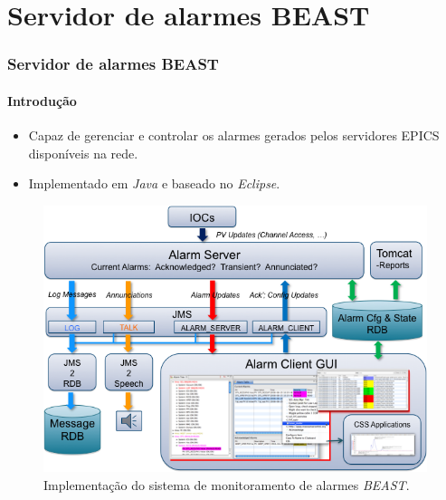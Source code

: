 
\section {Servidor de alarmes BEAST}

\begin{frame}
\frametitle{Servidor de alarmes BEAST}
\framesubtitle{Introdução}
\begin{itemize}
  \item Capaz de gerenciar e controlar os alarmes gerados pelos servidores
  EPICS disponíveis na rede.
  \item Implementado em \textit{Java} e baseado no \textit{Eclipse}.
\end{itemize}

\begin{figure}[h]

\centering
\includegraphics[scale=0.25]{image/beast-arquitetura}
\caption {Implementação do sistema de monitoramento de alarmes
\textit{BEAST}.}
\label{fig:best_arquitetura}
\end{figure}

\end{frame}


